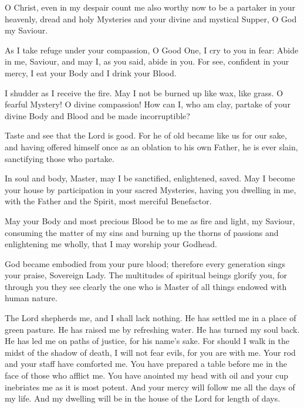 
O Christ, even in my despair count me also worthy now to be a partaker in your heavenly, dread and holy Mysteries and your divine and mystical Supper, O God my Saviour.

As I take refuge under your compassion, O Good One, I cry to you in fear: Abide in me, Saviour, and may I, as you said, abide in you. For see, confident in your mercy, I eat your Body and I drink your Blood.

\theotokion

I shudder as I receive the fire. May I not be burned up like wax, like grass. O fearful Mystery! O divine compassion! How can I, who am clay, partake of your divine Body and Blood and be made incorruptible?


Taste and see that the Lord is good. For he of old became like us for our sake, and having offered himself once as an oblation to his own Father, he is ever slain, sanctifying those who partake.

In soul and body, Master, may I be sanctified, enlightened, saved. May I become your house by participation in your sacred Mysteries, having you dwelling in me, with the Father and the Spirit, most merciful Benefactor.

May your Body and most precious Blood be to me as fire and light, my Saviour, consuming the matter of my sins and burning up the thorns of passions and enlightening me wholly, that I may worship your Godhead.

\theotokion

God became embodied from your pure blood; therefore every generation sings your praise, Sovereign Lady. The multitudes of spiritual beings glorify you, for through you they see clearly the one who is Master of all things endowed with human nature.


\newpage


\comelines


The Lord shepherds me, and I shall lack nothing. He has settled me in a place of green pasture. He has raised me by refreshing water. He has turned my soul back. He has led me on paths of justice, for his name's sake. For should I walk in the midst of the shadow of death, I will not fear evils, for you are with me. Your rod and your staff have comforted me. You have prepared a table before me in the face of those who afflict me. You have anointed my head with oil and your cup inebriates me as it is most potent. And your mercy will follow me all the days of my life. And my dwelling will be in the house of the Lord for length of days.

